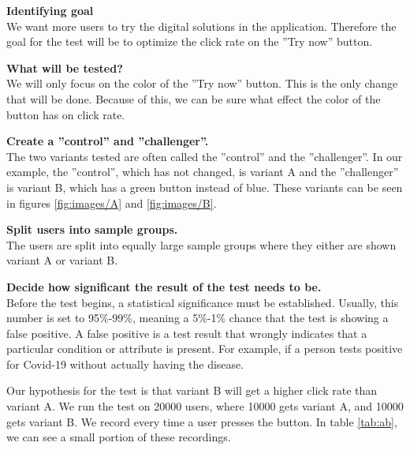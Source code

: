 \textbf{Identifying goal} \\
We want more users to try the digital solutions in the application. Therefore the goal for the test will be to optimize the click rate on the ''Try now'' button.

\textbf{What will be tested?}\\
We will only focus on the color of the ''Try now'' button. This is the only change that will be done. Because of this, we can be sure what effect the color of the button has on click rate. 

\textbf{Create a ''control'' and ''challenger''. }\\
The two variants tested are often called the ''control'' and the ''challenger''. In our example, the ''control'', which has not changed, is variant A and the ''challenger'' is variant B, which has a green button instead of blue. These variants can be seen in figures \ref{fig:images/A} and \ref{fig:images/B}.

\textbf{Split users into sample groups.}\\
The users are split into equally large sample groups where they either are shown variant A or variant B. 

\textbf{Decide how significant the result of the test needs to be.}\\
Before the test begins, a statistical significance must be established. Usually, this number is set to 95\%-99\%, meaning a 5\%-1\% chance that the test is showing a false positive. A false positive is a test result that wrongly indicates that a particular condition or attribute is present. For example, if a person tests positive for Covid-19 without actually having the disease.



Our hypothesis for the test is that variant B will get a higher click rate than variant A. We run the test on 20000 users, where 10000 gets variant A, and 10000 gets variant B. We record every time a user presses the button. In table \ref{tab:ab}, we can see a small portion of these recordings.

